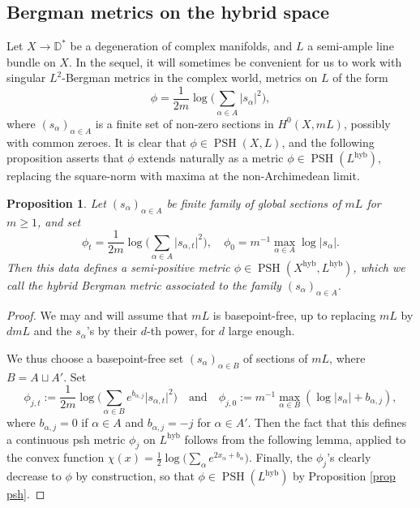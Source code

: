 \documentclass[JEP,XML,SOM,Unicode,published]{cedram}
\let\ts\textstyle
\newtheorem{prop}[equation]{Proposition}
\theoremstyle{definition}
\newcommand \D {\mathbb{D}}
\newcommand{\hyb}{\mathrm{hyb}}
\DeclareMathOperator{\PSH}{PSH}
\begin{document}
\subsection{Bergman metrics on the hybrid space}
Let $X \to \D^*$ be a degeneration of complex manifolds, and $L$ a semi-ample line bundle on $X$.
In the sequel, it will sometimes be convenient for us to work with singular $L^2$-Bergman metrics in the complex world, \ie metrics on $L$ of the form
\[
\phi = \frac{1}{2m} \log \ts\bigl(\sum_{\alpha \in A} \lvert s_{\alpha} \rvert^2 \bigr),
\]
where $(s_{\alpha})_{\alpha \in A}$ is a finite set of non-zero sections in $H^0(X, mL)$, possibly with common zeroes. It is clear that $\phi \in \PSH(X, L)$, and the following proposition asserts that $\phi$ extends naturally as a metric $\phi \in \PSH(L^{\hyb})$, replacing the square-norm with maxima at the non-Archimedean limit.
\begin{prop} \label{prop homo sing} Let $(s_{\alpha})_{\alpha \in A}$ be finite family of global sections of $mL$ for $m \ge 1$, and set
\[
\phi_t = \frac{1}{2m} \log \bigl({\ts\sum_{\alpha \in A} \lvert s_{\alpha, t} \rvert^2} \bigr),\quad
\phi_0 = m^{-1} \max_{\alpha \in A} \log \lvert s_{\alpha} \rvert.
\]
Then this data defines a semi-positive metric $\phi \in \PSH(X^{\hyb}, L^{\hyb})$, which we call the hybrid Bergman metric associated to the family $(s_{\alpha})_{\alpha \in A}$.
\end{prop}
\begin{proof}
We may and will assume that $mL$ is basepoint-free, up to replacing $mL$ by $dmL$ and the $s_{\alpha}$'s by their $d$-th power, for $d$ large enough.

We thus choose a basepoint-free set $(s_{\alpha})_{\alpha \in B}$ of sections of $mL$, where $B = A \sqcup A'$. Set
\[
\phi_{j,t}:= \frac{1}{2m} \log \bigl({\ts\sum_{\alpha \in B} e^{b_{\alpha,j}} \lvert s_{\alpha,t} \rvert^2} \bigr)\quad\text{and}\quad
\phi_{j, 0}:= m^{-1} \max_{\alpha \in B} (\log \lvert s_{\alpha} \rvert + b_{\alpha,j}),
\]
where $b_{\alpha, j} = 0$ if $\alpha \in A$ and $b_{\alpha, j} = -j$ for $\alpha \in A'$. Then the fact that this defines a continuous psh metric $\phi_j$ on $L^{\hyb}$ follows from the following lemma, applied to the convex function $\chi(x) = \frac{1}{2} \log \bigl(\sum_{\alpha} e^{2x_{\alpha} + b_{\alpha}} \bigr)$. Finally, the $\phi_j$'s clearly decrease to $\phi$ by construction, so that $\phi \in \PSH(L^{\hyb})$ by Proposition \ref{prop psh}.
\end{proof}
\end{document}
